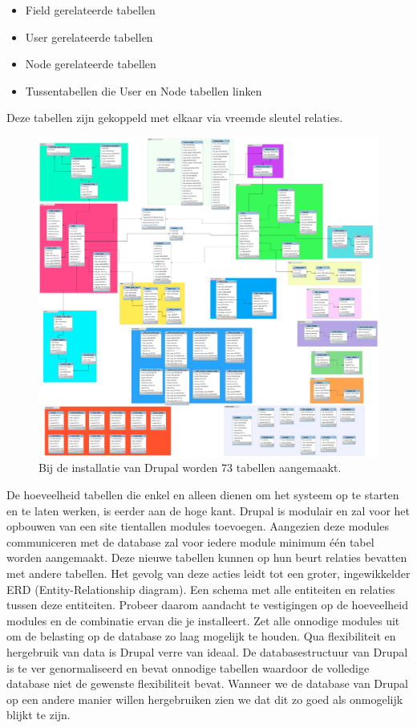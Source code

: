 \begin{itemize}
	\item{Field gerelateerde tabellen}
    \item{User gerelateerde tabellen}
    \item{Node gerelateerde tabellen}
    \item{Tussentabellen die User en Node tabellen linken}
\end{itemize}

\noindent
Deze tabellen zijn gekoppeld met elkaar via vreemde sleutel relaties.

\begin{figure}[!ht]
  \includegraphics[width=\textwidth]{img/dr-database-erd.png}
  \caption{Bij de installatie van Drupal worden 73 tabellen aangemaakt.}
  \label{fig:Drupal core ERD.}
\end{figure}

\noindent
De hoeveelheid tabellen die enkel en alleen dienen om het systeem op te starten en te laten werken, is eerder aan de hoge kant. Drupal is modulair en zal voor het opbouwen van een site tientallen modules toevoegen. Aangezien deze modules communiceren met de database zal voor iedere module minimum één tabel worden aangemaakt. Deze nieuwe tabellen kunnen op hun beurt relaties bevatten met andere tabellen. Het gevolg van deze acties leidt tot een groter, ingewikkelder ERD (Entity-Relationship diagram). Een schema met alle entiteiten en relaties tussen deze entiteiten. Probeer daarom aandacht te vestigingen op de hoeveelheid modules en de combinatie ervan die je installeert. Zet alle onnodige modules uit om de belasting op de database zo laag mogelijk te houden.
\newline\newline
Qua flexibiliteit en hergebruik van data is Drupal verre van ideaal. De databasestructuur van Drupal is te ver genormaliseerd en bevat onnodige tabellen waardoor de volledige database niet de gewenste flexibiliteit bevat. Wanneer we de database van Drupal op een andere manier willen hergebruiken zien we dat dit zo goed als onmogelijk blijkt te zijn.

